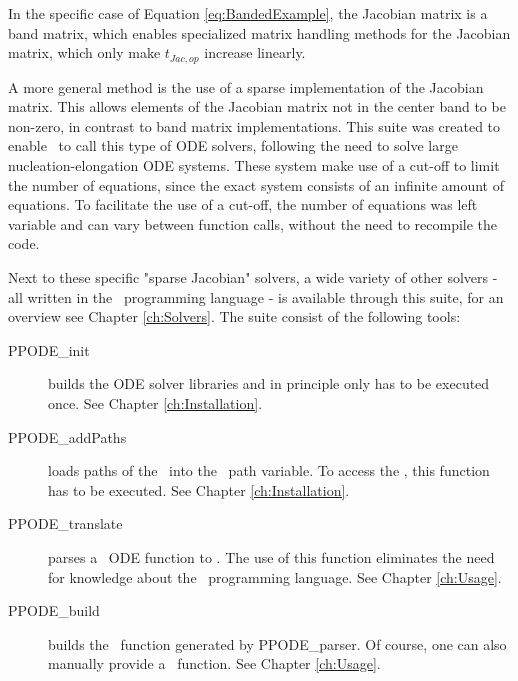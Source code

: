 In the specific case of Equation \ref{eq:BandedExample}, the Jacobian matrix is a band matrix, which enables specialized matrix handling methods for the Jacobian matrix, which only make $t_{Jac,op}$ increase linearly.

A more general method is the use of a sparse implementation of the Jacobian matrix. This allows elements of the Jacobian matrix not in the center band to be non-zero, in contrast to band matrix implementations. This suite was created to enable \MATLAB~to call this type of ODE solvers, following the need to solve large nucleation-elongation ODE systems. These system make use of a cut-off to limit the number of equations, since the exact system consists of an infinite amount of equations. To facilitate the use of a cut-off, the number of equations was left variable and can vary between function calls, without the need to recompile the code.

Next to these specific "sparse Jacobian" solvers, a wide variety of other solvers - all written in the \Fortran~programming language - is available through this suite, for an overview see Chapter \ref{ch:Solvers}. The suite consist of the following tools:
\begin{description}
 \item[PPODE\_init] builds the ODE solver libraries and in principle only has to be executed once. See Chapter \ref{ch:Installation}.
 \item[PPODE\_addPaths] loads paths of the \PPODESUITE~into the \MATLAB~path variable. To access the \PPODESUITE, this function has to be executed. See Chapter \ref{ch:Installation}.
 \item[PPODE\_translate] parses a \MATLAB~ODE function to \Fortran. The use of this function eliminates the need for knowledge about the \Fortran~programming language. See Chapter \ref{ch:Usage}.
 \item[PPODE\_build] builds the \Fortran~function generated by PPODE\_parser. Of course, one can also manually provide a \Fortran~function. See Chapter \ref{ch:Usage}.
\end{description}
